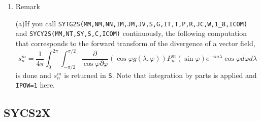 \documentclass[a4paper]{scrartcl}
\begin{document}
\begin{enumerate}
\item Remark

  (a)If you call
   \texttt{SYTG2S(MM,NM,NN,IM,JM,JV,S,G,IT,T,P,R,JC,W,1\_8,ICOM)} and
    \texttt{SYCY2S(MM,NT,SY,S,C,ICOM)} 
 continuously, 
    the following computation that corresponds to
    the forward transform of the divergence of a vector field,
\begin{equation}
s^m_n=\frac1{4\pi}\int^{2\pi}_0\int^{\pi/2}_{-\pi/2}
\frac{\partial}{\cos\varphi\partial\varphi}
\left(\cos\varphi g(\lambda,\varphi)\right)
P^m_n(\sin\varphi)
e^{-im\lambda}\cos\varphi d\varphi
d\lambda
\end{equation}
is done and $s^m_n$ is returned in \texttt{S}.
Note that integration by parts is applied and \texttt{IPOW=1} here.
  
    
\end{enumerate}


\subsection{SYCS2X}
\end{document}
